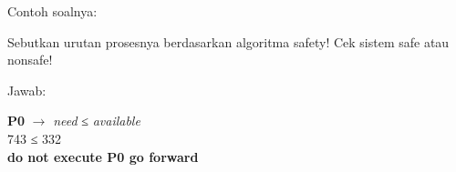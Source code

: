 \documentclass[12pt]{article}
\begin{document}
\begin{itemize}
\begin{enumerate}
        \begin{flushleft}
            Contoh soalnya:
            \begin{table}[h]
                \centering %
                \caption{Tabel Algoritma Safety} %
                \label{tab:your_label2} %
            \end{table}
            
            Sebutkan urutan prosesnya berdasarkan algoritma safety! Cek sistem safe atau nonsafe!
        \end{flushleft}

        Jawab:
        \begin{flushleft}
            \textbf{P0}   $\rightarrow$  \textit{need} ≤ \textit{available} \\ 
            \hspace*{5mm} 743 ≤ 332 \\ 
            \hspace*{5mm} \textbf{do not execute P0 go forward} \\ 
            

\end{flushleft}
\end{enumerate}
\end{itemize}
\end{document}
